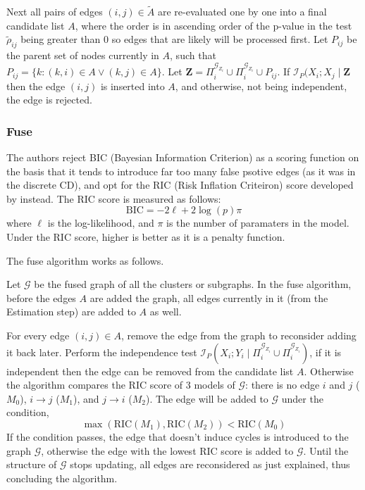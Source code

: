 \documentclass[twoside,11pt]{article}
\let\mc\mathcal
\let\mbf\mathbf
\begin{document}
Next all pairs of edges $(i,j)\in{\tilde A}$ are re-evaluated one by one into a final candidate list $A$, where the order is in ascending order of the p-value in the test $\tilde\rho_{ij}$ being greater than $0$ so edges that are likely will be processed first. Let $P_{ij}$ be the parent set of nodes currently in $A$, such that $P_{ij}=\{k: (k,i)\in A \vee (k,j)\in A \}$. Let $\mbf Z = \Pi_i^{\mc{G}_{Z_i}} \cup \Pi_i^{\mc{G}_{Z_i}} \cup P_{ij}$. If $\mc{I}_P(X_i;X_j \mid \mbf Z$ then the edge $(i,j)$ is inserted into $A$, and otherwise, not being independent, the edge is rejected. 

\subsubsection{Fuse}

The authors reject BIC (Bayesian Information Criterion) as a scoring function on the basis that it tends to introduce far too many false psotive edges (as it was in the discrete CD), and opt for the RIC (Risk Inflation Criteiron) score developed by \citeauthor{foster1994risk} instead. The RIC score is measured as follows:
\begin{equation*}
    \text{BIC}=-2\ell+2\log(p)\pi
\end{equation*}
where $\ell$ is the log-likelihood, and $\pi$ is the number of paramaters in the model. Under the RIC score, higher is better as it is a penalty function.

The fuse algorithm works as follows.

Let $\mc{G}$ be the fused graph of all the clusters or subgraphs. In the fuse algorithm, before the edges $A$ are added the graph, all edges currently in it (from the Estimation step) are added to $A$ as well.

For every edge $(i,j)\in{A}$, remove the edge from the graph to reconsider adding it back later. Perform the independence test $\mc{I}_P(X_i;Y_i \mid \Pi_i^{\mc{G}_{Z_i}}\cup\Pi_i^{\mc{G}_{Z_i}})$, if it is independent then the edge can be removed from the candidate list $A$. Otherwise the algorithm compares the RIC score of 3 models of $\mc{G}$: there is no edge $i$ and $j$ ($M_0$), $i\rightarrow j$ ($M_1$), and $j\rightarrow i$ ($M_2$). The edge will be added to $\mc{G}$ under the condition,
\begin{equation*}
    \max(\text{RIC}(M_1),\text{RIC}(M_2))<\text{RIC}(M_0)
\end{equation*}
If the condition passes, the edge that doesn't induce cycles is introduced to the graph $\mc{G}$, otherwise the edge with the lowest RIC score is added to $\mc{G}$. Until the structure of $\mc{G}$ stops updating, all edges are reconsidered as just explained, thus concluding the algorithm.
\end{document}
